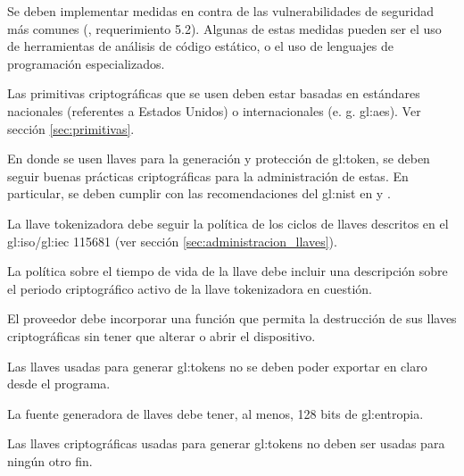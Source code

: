 {
  Se deben implementar medidas en contra de las vulnerabilidades de
  seguridad más comunes (\cite{dss_pa}, requerimiento 5.2). Algunas de estas
  medidas pueden ser el uso de herramientas de análisis de código estático,
  o el uso de lenguajes de programación especializados.
}

{
  Las primitivas criptográficas que se usen deben estar basadas en
  estándares nacionales (referentes a Estados Unidos) o internacionales (e. g.
  \gls{gl:aes}). Ver sección \ref{sec:primitivas}.
}



{
  En donde se usen llaves para la generación y protección de \gls{gl:token},
  se deben seguir buenas prácticas criptográficas para la administración de
  estas. En particular, se deben cumplir con las recomendaciones del
  \gls{gl:nist} en \cite{nist_llaves} y \cite{nist_disenio_llaves}.

  {
    La llave tokenizadora debe seguir la política de los ciclos de llaves
    descritos en el \acrshort{gl:iso}/\acrshort{gl:iec} 115681 (ver
    sección \ref{sec:administracion_llaves}).
  }

  {
    La política sobre el tiempo de vida de la llave debe incluir una
    descripción sobre el periodo criptográfico activo de la llave
    tokenizadora en cuestión.
  }

  {
   	El proveedor debe incorporar una función que permita la destrucción
   	de sus llaves criptográficas sin tener que alterar o abrir el
   	dispositivo.
  }

  {
    Las llaves usadas para generar \glspl{gl:token} no se deben poder
    exportar en claro desde el programa.
  }

  {
    La fuente generadora de llaves debe tener, al menos, 128 bits de
    \gls{gl:entropia}.
  }

  {
    Las llaves criptográficas usadas para generar \glspl{gl:token} no
    deben ser usadas para ningún otro fin.
  }
}

